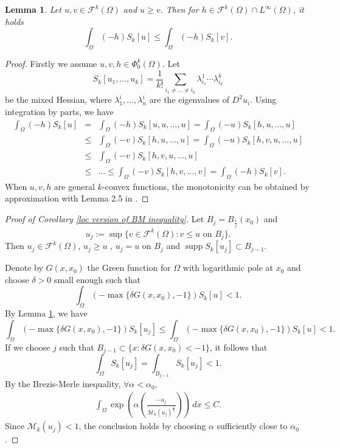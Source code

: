 \documentclass[11pt]{amsart}
\numberwithin{equation}{section}
\newtheorem{lemma}[theorem]{Lemma}
\numberwithin{equation}{section}
\begin{document}
\begin{lemma}\label{hessian comparison}
	Let $u, v \in \mathcal{F}^k(\Omega)$ and $u \ge v$. Then for $h \in \mathcal{F}^k(\Omega)\cap L^\infty(\Omega)$, it holds
	$$\int_{\Omega} (-h) S_k[u] \le \int_{\Omega} (-h) S_k[v].$$
\end{lemma}
\begin{proof}
	Firstly we assume $u, v, h  \in \Phi_{0}^k(\Omega)$. 
	Let  
	\[S_k[u_1,..., u_k]=\frac{1}{k!}\sum_{ i_1\neq...\neq i_k}\lambda_{i_1}^1\cdots\lambda_{i_k}^k\]
	be the mixed Hessian, where $\lambda^i_1,...,\lambda^i_n$ are the eigenvalues of $D^2 u_i$. Using integration by parts, we have
	\begin{eqnarray*}
		\int_{\Omega} (-h) S_k[u]&=&\int_{\Omega} (-h) S_k[u, u, \dots, u]
		=\int_{\Omega} (-u) S_k[h, u, \dots, u]\\
		&\leq& \int_{\Omega} (-v) S_k[h, u, \dots, u]
		=\int_{\Omega} (-u) S_k[h, v, u , \dots, u]\\
		&\leq& \int_{\Omega} (-v) S_k[h, v, u, \dots, u]\\
		& \le& \dots \le \int_{\Omega} (-v) S_k[h, v, \dots, v] = \int_{\Omega} (-h) S_k[v].
	\end{eqnarray*}
	When $u,v, h$ are general $k$-convex functions, the monotonicity can be obtained by approximation with Lemma 2.5 in \cite{TW02}.
\end{proof}

\begin{proof}[Proof of Corollary \ref{loc version of BM inequality}]
	Let $B_j=B_{\frac{1}{j}}(x_0)$ and
	\[
	u_j := \sup \{ v \in \mathcal{F}^k(\Omega) : v \leq u \text{ on } B_j \}.
	\]
	Then $u_j \in \mathcal{F}^k(\Omega)$, $u_j \geq u$ , $u_j = u$ on $B_j$ and $\operatorname{supp}S_k [u_j]\subset B_{j-1}$. 
	
	Denote by $G(x,x_0)$ the Green function for $\Omega$ with logarithmic pole at $x_0$ and
	choose $\delta > 0$ small enough such that
	\[
	\int_{\Omega} (-\max\{\delta G(x,x_0), -1\}) S_k [u]< 1.
	\]
	By Lemma \ref{hessian comparison}, we have
	\[
	\int_{\Omega} (-\max\{\delta G(x,x_0), -1\}) S_k [u_j]
	\leq \int_{\Omega} (-\max\{\delta G(x,x_0), -1\}) S_k [u]< 1.
	\]
	If we choose $j$ such that $B_{j-1}\subset \{x: \delta G(x,x_0) < -1\}$, it follows that
	\[
	\int_{\Omega} S_k[u_j] = \int_{B_{j-1}} S_k[u_j]< 1.
	\]
	By the Brezis-Merle inequality, $\forall \alpha<\alpha_0$,
	\begin{eqnarray*}
		\int_{\Omega} \exp\left(\alpha\left(\frac{-u_j}{\mathcal M_k(u_j)^{\frac{1}{k}}}\right)\right)\,dx\leq C.
	\end{eqnarray*}
	Since $\mathcal M_k(u_j)<1$, the conclusion holds by choosing $\alpha$ sufficiently close to $\alpha_0$.
\end{proof}
\end{document}
